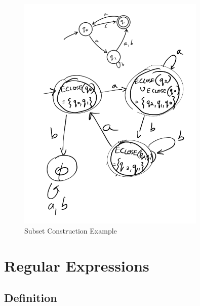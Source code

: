\documentclass[a4paper]{article}
\theoremstyle{plain}
\theoremstyle{definition}
\newtheorem{exmp}{Example}[section]
\theoremstyle{remark}
\begin{document}
\begin{tcolorbox}[colback=black!3!white,colframe=black!60!white,title=\begin{exmp}Subset Construction \label{Subset Construction}\end{exmp}]
        \begin{figure}[H]
        	\centering
        	\includegraphics[width=0.8\textwidth]{one.png}
        	\caption{Subset Construction Example}
        	\label{fig:one-png}
        \end{figure}
\end{tcolorbox}
\section{Regular Expressions}
\subsection{Definition}
\end{document}
